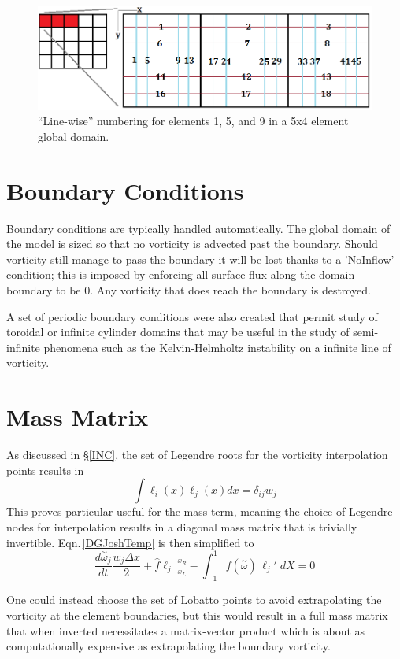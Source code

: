 \documentclass[letterpaper,12pt]{report}
\newcommand{\be}{\begin{equation}}
\newcommand{\ben}[1]{\begin{equation}\label{#1}}
\newcommand{\ee}{\end{equation}}
\newcommand{\aomega}{\overset{\sim}{\omega}}				%
\begin{document}
\begin{figure}
\centering
\includegraphics[width=6in]{streams.PNG}
\caption{\label{fig:streams}``Line-wise'' numbering for elements 1, 5, and 9 in a 5x4 element global domain.}
\end{figure}

%
\section{Boundary Conditions}
Boundary conditions are typically handled automatically. The global domain of the model is sized so that no vorticity is advected past the boundary. Should vorticity still manage to pass the boundary it will be lost thanks to a 'NoInflow' condition; this is imposed by enforcing all surface flux along the domain boundary to be 0. Any vorticity that does reach the boundary is destroyed.

A set of periodic boundary conditions were also created that permit study of toroidal or infinite cylinder domains that may be useful in the study of semi-infinite phenomena such as the Kelvin-Helmholtz instability on a infinite line of vorticity.

%
\section{Mass Matrix}\label{MassM}
As discussed in \S\ref{INC}, the set of Legendre roots for the vorticity interpolation points results in
\be \int \ell_i(x) \ell_j(x) dx = \delta_{ij} w_j \ee
This proves particular useful for the mass term, meaning the choice of Legendre nodes for interpolation results in a diagonal mass matrix that is trivially invertible.  Eqn.\,\eqref{DGJoshTemp} is then simplified to
\ben{DGJoshTemp2} \frac{d \aomega_j}{dt} \frac{w_j \Delta x}{2}
+\hat{f}\ell_j \Big|^{x_R}_{x_L} 
- \int_{-1}^{1} f(\aomega) \, \ell_j' \;dX = 0 \ee

One could instead choose the set of Lobatto points to avoid extrapolating the vorticity at the element boundaries, but this would result in a full mass matrix that when inverted necessitates a matrix-vector product which is about as computationally expensive as extrapolating the boundary vorticity.
\end{document}
